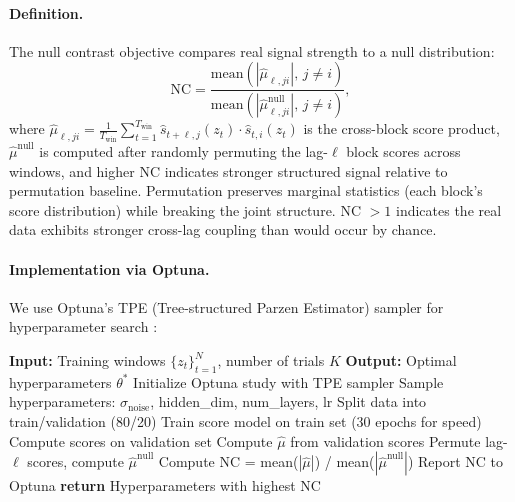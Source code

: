 \documentclass{article}
\theoremstyle{plain}
\theoremstyle{definition}
\theoremstyle{remark}
\newcommand{\1}{\mathbf{1}}
\begin{document}
\paragraph{Definition.}
The null contrast objective compares real signal strength to a null distribution:
\begin{equation}
\mathrm{NC} = \frac{\mathrm{mean}(|\widehat{\mu}_{\ell,ji}|, \, j \neq i)}{\mathrm{mean}(|\widehat{\mu}^{\mathrm{null}}_{\ell,ji}|, \, j \neq i)},
\label{eq:nc_detailed}
\end{equation}
where $\widehat{\mu}_{\ell,ji} = \frac{1}{T_{\mathrm{win}}} \sum_{t=1}^{T_{\mathrm{win}}} \widehat{s}_{t+\ell,j}(z_t) \cdot \widehat{s}_{t,i}(z_t)$ is the cross-block score product,
 $\widehat{\mu}^{\mathrm{null}}$ is computed after randomly permuting the lag-$\ell$ block scores across windows, and higher NC indicates stronger structured signal relative to permutation baseline. Permutation preserves marginal statistics (each block's score distribution) while breaking the joint structure. NC $> 1$ indicates the real data exhibits stronger cross-lag coupling than would occur by chance.

\paragraph{Implementation via Optuna.}
We use Optuna's TPE (Tree-structured Parzen Estimator) sampler for hyperparameter search \citep{akiba2019optuna}:

\begin{algorithm}[h!]
\caption{Hyperparameter Optimization via Null Contrast}
\label{alg:hp_optuna}
\begin{center}
\begin{minipage}{0.85\textwidth}
\begin{algorithmic}[1]
\scriptsize
\STATE \textbf{Input:} Training windows $\{z_t\}_{t=1}^N$, number of trials $K$
\STATE \textbf{Output:} Optimal hyperparameters $\theta^*$
\STATE Initialize Optuna study with TPE sampler
    \STATE Sample hyperparameters: $\sigma_{\mathrm{noise}}$, hidden\_dim, num\_layers, lr
    \STATE Split data into train/validation (80/20)
    \STATE Train score model on train set (30 epochs for speed)
    \STATE Compute scores on validation set
    \STATE Compute $\widehat{\mu}$ from validation scores
    \STATE Permute lag-$\ell$ scores, compute $\widehat{\mu}^{\mathrm{null}}$
    \STATE Compute NC = mean($|\widehat{\mu}|$) / mean($|\widehat{\mu}^{\mathrm{null}}|$)
    \STATE Report NC to Optuna
\ENDFOR
\STATE \textbf{return} Hyperparameters with highest NC
\end{algorithmic}
\end{minipage}
\end{center}
\end{algorithm}
\end{document}
